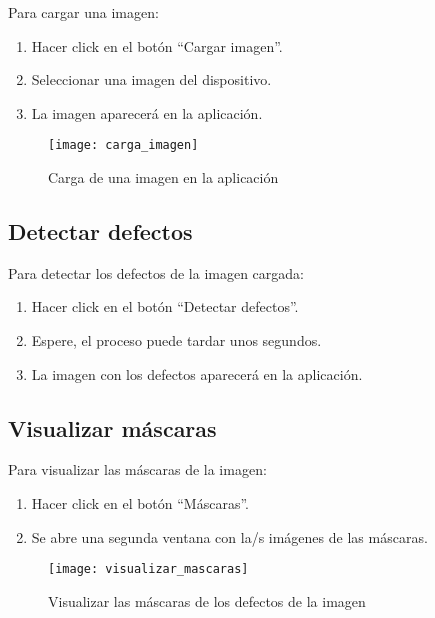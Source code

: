 Para cargar una imagen:

\begin{enumerate}
    \item Hacer click en el botón ``Cargar imagen''.
    \item Seleccionar una imagen del dispositivo.
    \item La imagen aparecerá en la aplicación.
\end{enumerate}

\begin{figure}[H]
	\centering
	\texttt{[image: carga\_imagen]}
	\caption{Carga de una imagen en la aplicación}
	\label{carga_imagen}
\end{figure}

\subsection{Detectar defectos}

Para detectar los defectos de la imagen cargada:

\begin{enumerate}
    \item Hacer click en el botón ``Detectar defectos''.
    \item Espere, el proceso puede tardar unos segundos.
    \item La imagen con los defectos aparecerá en la aplicación.
\end{enumerate}


\newpage

\subsection{Visualizar máscaras}

Para visualizar las máscaras de la imagen:

\begin{enumerate}
    \item Hacer click en el botón ``Máscaras''.
    \item Se abre una segunda ventana con la/s imágenes de las máscaras.
\end{enumerate}

\begin{figure}[H]
	\centering
	\texttt{[image: visualizar\_mascaras]}
	\caption{Visualizar las máscaras de los defectos de la imagen}
	\label{visualizar_mascaras}
\end{figure}

